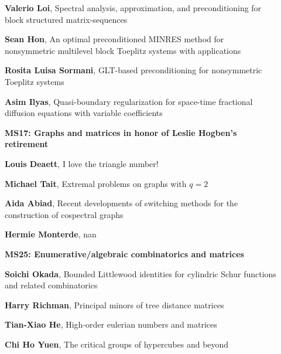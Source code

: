 \documentclass[ILAS2025-program.tex]{subfiles}
\begin{document}
\begin{description}
\begin{description}
    \item[] \textbf{Valerio Loi}, Spectral analysis, approximation, and preconditioning for block structured matrix-sequences
        \item[] \textbf{Sean Hon}, An optimal preconditioned MINRES method for nonsymmetric multilevel block Toeplitz systems with applications
        \item[] \textbf{Rosita Luisa Sormani}, GLT-based preconditioning for nonsymmetric Toeplitz systems
        \item[] \textbf{Asim Ilyas}, Quasi-boundary regularization for space-time fractional diffusion equations with variable coefficients
        \end{description}
    \begin{description}
    \item[] {\color{mstitle}\textbf{MS17: Graphs and matrices in honor of Leslie Hogben's retirement}} 
    \item[] \textbf{Louis Deaett}, I love the triangle number!
        \item[] \textbf{Michael Tait}, Extremal problems on graphs with $q=2$
        \item[] \textbf{Aida Abiad}, Recent developments of switching methods for the construction of cospectral graphs
        \item[] \textbf{Hermie Monterde}, nan
        \end{description}
    \begin{description}
    \item[] {\color{mstitle}\textbf{MS25: Enumerative/algebraic combinatorics and matrices}} 
    \item[] \textbf{Soichi Okada}, Bounded Littlewood identities for cylindric Schur functions and related combinatorics
        \item[] \textbf{Harry Richman}, Principal minors of tree distance matrices
        \item[] \textbf{Tian-Xiao He}, High-order eulerian numbers and matrices
        \item[] \textbf{Chi Ho Yuen}, The critical groups of hypercubes and beyond
        \end{description}

\end{description}
\end{document}
